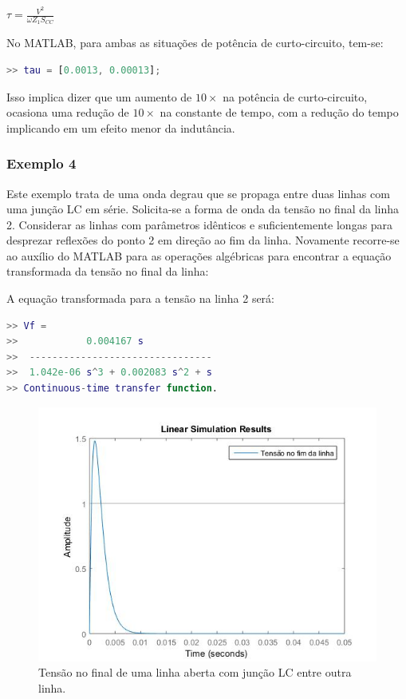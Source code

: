 \begin{center}
    $\tau = \frac{V^2}{ \omega Z_1 S_{CC}}$
\end{center}

No MATLAB, para ambas as situações de potência de curto-circuito, tem-se:



\begin{lstlisting}[language=Matlab,style=consolestyle]
>> tau = [0.0013, 0.00013];
\end{lstlisting}

Isso implica dizer que um aumento de $10\times$ na potência de curto-circuito, ocasiona uma redução de $10\times$ na constante de tempo, com a redução do tempo implicando em um efeito menor da indutância.

\subsubsection*{Exemplo 4}

Este exemplo trata de uma  onda degrau que se propaga entre duas linhas com uma junção LC em série. Solicita-se a forma de onda da tensão no final da linha 2. Considerar as linhas com parâmetros idênticos e suficientemente longas para desprezar reflexões do ponto 2 em direção ao fim da linha. Novamente recorre-se ao auxílio do MATLAB para as operações algébricas para encontrar a equação transformada da tensão no final da linha:



A equação transformada para a tensão na linha 2 será:

\begin{lstlisting}[language=Matlab,style=consolestyle]
>> Vf =
>>            0.004167 s
>>  --------------------------------
>>  1.042e-06 s^3 + 0.002083 s^2 + s
>> Continuous-time transfer function.
\end{lstlisting}

\begin{figure}[H]
\begin{center}
\includegraphics[width=12cm]{images/sim2.jpg}
\caption{Tensão no final de uma linha aberta com junção LC entre outra linha.}
\label{sim:2} 
\end{center}
\end{figure}

